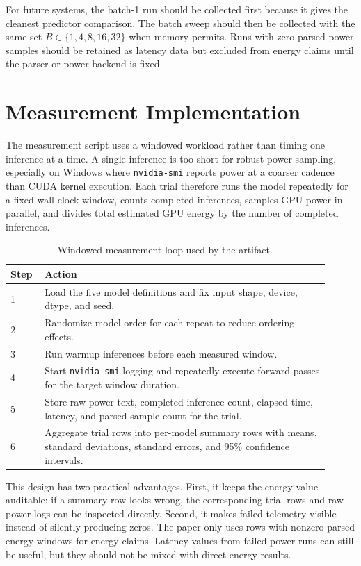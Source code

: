 \documentclass[conference]{IEEEtran}
\begin{document}
For future systems, the batch-1 run should be collected first because it gives
the cleanest predictor comparison. The batch sweep should then be collected
with the same set $B\in\{1,4,8,16,32\}$ when memory permits. Runs with zero
parsed power samples should be retained as latency data but excluded from
energy claims until the parser or power backend is fixed.

\section{Measurement Implementation}

The measurement script uses a windowed workload rather than timing one
inference at a time. A single inference is too short for robust power sampling,
especially on Windows where \texttt{nvidia-smi} reports power at a coarser
cadence than CUDA kernel execution. Each trial therefore runs the model
repeatedly for a fixed wall-clock window, counts completed inferences, samples
GPU power in parallel, and divides total estimated GPU energy by the number of
completed inferences.

\begin{table}[t]
\centering
\caption{Windowed measurement loop used by the artifact.}
\label{tab:algorithm}
\scriptsize
\begin{tabular}{@{}L{0.09\linewidth}L{0.82\linewidth}@{}}
\toprule
Step & Action\\
 & Load the five model definitions and fix input shape, device, dtype, and seed.\\
2 & Randomize model order for each repeat to reduce ordering effects.\\
3 & Run warmup inferences before each measured window.\\
4 & Start \texttt{nvidia-smi} logging and repeatedly execute forward passes for
the target window duration.\\
5 & Store raw power text, completed inference count, elapsed time, latency, and
parsed sample count for the trial.\\
6 & Aggregate trial rows into per-model summary rows with means, standard
deviations, standard errors, and 95\% confidence intervals.\\
\bottomrule
\end{tabular}
\end{table}

This design has two practical advantages. First, it keeps the energy value
auditable: if a summary row looks wrong, the corresponding trial rows and raw
power logs can be inspected directly. Second, it makes failed telemetry visible
instead of silently producing zeros. The paper only uses rows with nonzero
parsed energy windows for energy claims. Latency values from failed power runs
can still be useful, but they should not be mixed with direct energy results.
\end{document}
